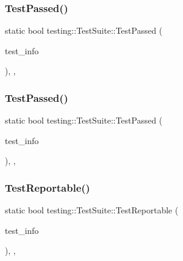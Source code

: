 \mbox{\label{classtesting_1_1_test_suite_a30cb6d26a98feda5c2af89a15abd3264}} 
\subsubsection{\texorpdfstring{TestPassed()}{TestPassed()}\hspace{0.1cm}{\footnotesize\ttfamily [1/2]}}
{\footnotesize\ttfamily static bool testing\+::\+Test\+Suite\+::\+Test\+Passed (\begin{DoxyParamCaption}\item[{const \mbox{\hyperlink{classtesting_1_1_test_info}{Test\+Info}} $\ast$}]{test\+\_\+info }\end{DoxyParamCaption})\hspace{0.3cm}{\ttfamily [inline]}, {\ttfamily [static]}, {\ttfamily [private]}}

\mbox{\label{classtesting_1_1_test_suite_a30cb6d26a98feda5c2af89a15abd3264}} 
\subsubsection{\texorpdfstring{TestPassed()}{TestPassed()}\hspace{0.1cm}{\footnotesize\ttfamily [2/2]}}
{\footnotesize\ttfamily static bool testing\+::\+Test\+Suite\+::\+Test\+Passed (\begin{DoxyParamCaption}\item[{const \mbox{\hyperlink{classtesting_1_1_test_info}{Test\+Info}} $\ast$}]{test\+\_\+info }\end{DoxyParamCaption})\hspace{0.3cm}{\ttfamily [inline]}, {\ttfamily [static]}, {\ttfamily [private]}}

\mbox{\label{classtesting_1_1_test_suite_a939aba8925d609fb5d01464edad0b4d7}} 
\subsubsection{\texorpdfstring{TestReportable()}{TestReportable()}\hspace{0.1cm}{\footnotesize\ttfamily [1/2]}}
{\footnotesize\ttfamily static bool testing\+::\+Test\+Suite\+::\+Test\+Reportable (\begin{DoxyParamCaption}\item[{const \mbox{\hyperlink{classtesting_1_1_test_info}{Test\+Info}} $\ast$}]{test\+\_\+info }\end{DoxyParamCaption})\hspace{0.3cm}{\ttfamily [inline]}, {\ttfamily [static]}, {\ttfamily [private]}}


